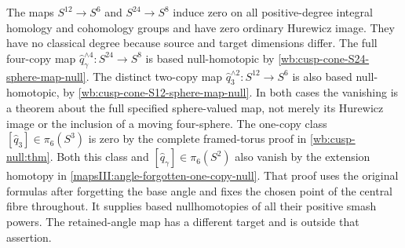 The maps \(S^{12}\to S^6\) and \(S^{24}\to S^8\) induce zero on all
positive-degree integral homology and cohomology groups and have zero
ordinary Hurewicz image.  They have no classical degree because source and
target dimensions differ.  The full four-copy map
\(\widehat q_\gamma^{\wedge4}:S^{24}\to S^8\) is based null-homotopic by
\cref{wb:cusp-cone-S24-sphere-map-null}.  The distinct two-copy map
\(\widehat q_3^{\wedge2}:S^{12}\to S^6\) is also based null-homotopic, by
\cref{wb:cusp-cone-S12-sphere-map-null}.  In both cases the vanishing is a
theorem about the full specified sphere-valued map, not merely its Hurewicz
image or the inclusion of a moving four-sphere. %
The one-copy class
\([\widehat q_3]\in\pi_6(S^3)\) is zero by the complete framed-torus
proof in \cref{wb:cusp-null:thm}.  Both this class and
\([\widehat q_\gamma]\in\pi_6(S^2)\) also vanish by the extension
homotopy in \cref{mapsIII:angle-forgotten-one-copy-null}.  That proof
uses the original formulas after forgetting the base angle and fixes
the chosen point of the central fibre throughout.  It supplies based
nullhomotopies of all their positive smash powers.  The retained-angle
map has a different target and is outside that assertion.





